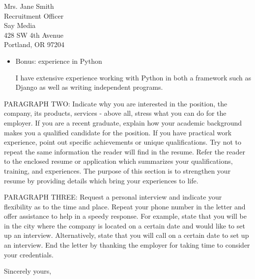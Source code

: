 \documentclass[11pt]{letter} %
\begin{document}
\begin{letter}{Mrs. Jane Smith \\
Recruitment Officer \\
Say Media \\
428 SW 4th Avenue \\
Portland, OR 97204}
\begin{itemize}
  \item Bonus: experience in Python

        I have extensive experience working with Python in both a framework such
        as Django as well as writing independent programs.

\end{itemize}

PARAGRAPH TWO: Indicate why you are interested in the position, the company, its
products, services - above all, stress what you can do for the employer. If you
are a recent graduate, explain how your academic background makes you a
qualified candidate for the position. If you have practical work experience,
point out specific achievements or unique qualifications. Try not to repeat the
same information the reader will find in the resume. Refer the reader to the
enclosed resume or application which summarizes your qualifications, training,
and experiences. The purpose of this section is to strengthen your resume by
providing details which bring your experiences to life. 
 
PARAGRAPH THREE: Request a personal interview and indicate your flexibility as
to the time and place. Repeat your phone number in the letter and offer
assistance to help in a speedy response. For example, state that you will be in
the city where the company is located on a certain date and would like to set up
an interview. Alternatively, state that you will call on a certain date to set
up an interview. End the letter by thanking the employer for taking time to
consider your credentials. 

\closing{Sincerely yours,}




\end{letter}
\end{document}
